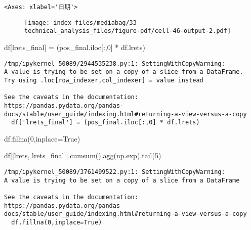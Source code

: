 \documentclass[
  letterpaper,
  DIV=11,
  numbers=noendperiod]{scrreprt}
\newenvironment{Shaded}{\begin{snugshade}}{\end{snugshade}}
\newcommand{\DecValTok}[1]{\textcolor[rgb]{0.68,0.00,0.00}{#1}}
\newcommand{\NormalTok}[1]{\textcolor[rgb]{0.00,0.23,0.31}{#1}}
\newcommand{\OperatorTok}[1]{\textcolor[rgb]{0.37,0.37,0.37}{#1}}
\newcommand{\StringTok}[1]{\textcolor[rgb]{0.13,0.47,0.30}{#1}}
\newcommand{\VariableTok}[1]{\textcolor[rgb]{0.07,0.07,0.07}{#1}}
\begin{document}
\begin{verbatim}
<Axes: xlabel='日期'>
\end{verbatim}

\begin{figure}[H]

{\centering \texttt{[image: index\_files/mediabag/33-technical\_analysis\_files/figure-pdf/cell-46-output-2.pdf]}

}

\end{figure}

\begin{Shaded}
\begin{Highlighting}[]
\NormalTok{df[}\StringTok{\textquotesingle{}lrets\_final\textquotesingle{}}\NormalTok{] }\OperatorTok{=}\NormalTok{ (pos\_final.iloc[:,}\DecValTok{0}\NormalTok{] }\OperatorTok{*}\NormalTok{ df.lrets)}
\end{Highlighting}
\end{Shaded}

\begin{verbatim}
/tmp/ipykernel_50089/2944535238.py:1: SettingWithCopyWarning: 
A value is trying to be set on a copy of a slice from a DataFrame.
Try using .loc[row_indexer,col_indexer] = value instead

See the caveats in the documentation: https://pandas.pydata.org/pandas-docs/stable/user_guide/indexing.html#returning-a-view-versus-a-copy
  df['lrets_final'] = (pos_final.iloc[:,0] * df.lrets)
\end{verbatim}

\begin{Shaded}
\begin{Highlighting}[]

\NormalTok{df.fillna(}\DecValTok{0}\NormalTok{,inplace}\OperatorTok{=}\VariableTok{True}\NormalTok{)}

\NormalTok{df[[}\StringTok{\textquotesingle{}lrets\textquotesingle{}}\NormalTok{, }\StringTok{\textquotesingle{}lrets\_final\textquotesingle{}}\NormalTok{]].cumsum().agg(np.exp).tail(}\DecValTok{5}\NormalTok{)}
\end{Highlighting}
\end{Shaded}

\begin{verbatim}
/tmp/ipykernel_50089/3761499522.py:1: SettingWithCopyWarning: 
A value is trying to be set on a copy of a slice from a DataFrame

See the caveats in the documentation: https://pandas.pydata.org/pandas-docs/stable/user_guide/indexing.html#returning-a-view-versus-a-copy
  df.fillna(0,inplace=True)
\end{verbatim}
\end{document}
